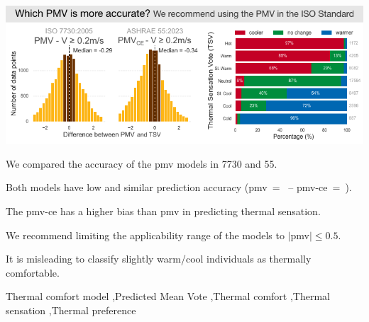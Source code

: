 \begin{frontmatter}
    \begin{graphicalabstract}
        \includegraphics[width=\linewidth]{figures/graphical_abstract}
    \end{graphicalabstract}


    \begin{highlights}
        \item We compared the accuracy of the \ac{pmv} models in \gls{7730} and \gls{55}.
        \item Both models have low and similar prediction accuracy (\ac{pmv}~=~ -- \ac{pmv-ce}~=~).
        \item The \ac{pmv-ce} has a higher bias than \ac{pmv} in predicting thermal sensation.
        \item We recommend limiting the applicability range of the models to $\mid$\ac{pmv}$\mid \leq 0.5$.
        \item It is misleading to classify slightly warm/cool individuals as thermally comfortable.
    \end{highlights}

    \begin{keyword}
        Thermal comfort model \sep Predicted Mean Vote \sep Thermal comfort \sep Thermal sensation \sep Thermal preference
    \end{keyword}

\end{frontmatter}
